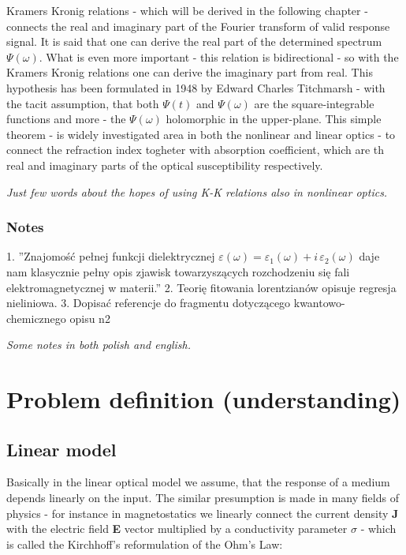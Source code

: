 \documentclass[12pt,twoside,a4paper]{article}
\numberwithin{equation}{subsection}
\numberwithin{figure}{subsection}
\begin{document}
Kramers Kronig relations - which will be derived in the following chapter - connects the real and imaginary part of the Fourier
transform of valid response signal. It is said that one can derive the real part of the determined spectrum $\Psi (\omega )$. What is 
even more important - this relation is bidirectional - so with the Kramers Kronig relations one can derive the imaginary part from real. 
This hypothesis has been formulated in 1948 by Edward Charles Titchmarsh - with the tacit assumption, that both $\Psi (t)$ and 
$\Psi (\omega )$ are the square-integrable functions and more - the $\Psi (\omega )$ holomorphic in the upper-plane. This simple theorem 
- is widely investigated area in both the nonlinear and linear optics - to connect the refraction index togheter with absorption coefficient, 
which are th real and imaginary parts of the optical susceptibility respectively.

\textit{Just few words about the hopes of using K-K relations also in nonlinear optics.}

\subsubsection*{Notes}

1. ''Znajomość pełnej funkcji dielektrycznej $\varepsilon (\omega )={\varepsilon_{1}}(\omega ) + i\,{\varepsilon_{2}}(\omega )$
 daje nam klasycznie pełny opis zjawisk towarzyszących rozchodzeniu się fali elektromagnetycznej w materii.''
2. Teorię fitowania lorentzianów opisuje regresja nieliniowa.
3. Dopisać referencje do fragmentu dotyczącego kwantowo-chemicznego opisu n2

\textit{Some notes in both polish and english.}

\section{Problem definition (understanding)} \label{chap:problem}

\subsection{Linear model} \label{chap:problem_lin}

Basically in the linear optical model we assume, that the response of a medium depends linearly on the input. The similar presumption is
made in many fields of physics - for instance in magnetostatics we linearly connect the current density \textbf{J} with the electric
field \textbf{E} vector multiplied by a conductivity parameter $\sigma $ - which is called the Kirchhoff's reformulation of the Ohm's Law:
\end{document}
